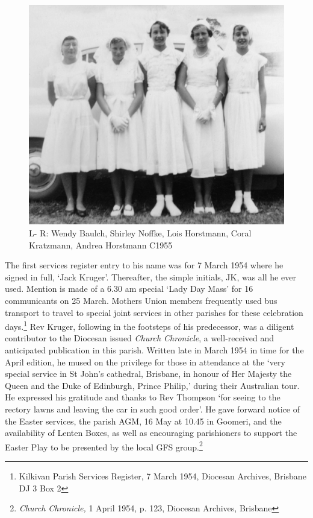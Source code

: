 \begin{figure}[!htb]
\begin{center}
\includegraphics[width=1.\textwidth,center]{../images/confirmation1955.jpg}
\caption{L- R: Wendy Baulch, Shirley Noffke, Lois Horstmann, Coral Kratzmann, Andrea Horstmann C1955}
\end{center}
\end{figure}




The first services register entry to his name was for 7 March 1954 where he signed in full, `Jack Kruger'. Thereafter, the simple initials, JK, was all he ever used. Mention is made of a 6.30 am special `Lady Day Mass' for 16 communicants on 25 March. Mothers Union members frequently used bus transport to travel to special joint services in other parishes for these celebration days.\footnote{Kilkivan Parish Services Register, 7 March 1954, Diocesan Archives, Brisbane DJ 3 Box 2} Rev Kruger, following in the footsteps of his predecessor, was a diligent contributor to the Diocesan issued \emph{Church Chronicle}, a well-received and anticipated publication in this parish. Written late in March 1954 in time for the April edition, he mused on the privilege for those in attendance at the `very special service in St John's cathedral, Brisbane, in honour of Her Majesty the Queen and the Duke of Edinburgh, Prince Philip,' during their Australian tour. He expressed his gratitude and thanks to Rev Thompson `for seeing to the rectory lawns and leaving the car in such good order'. He gave forward notice of the Easter services, the parish AGM, 16 May at 10.45 in Goomeri, and the availability of Lenten Boxes, as well as encouraging parishioners to support the Easter Play to be presented by the local GFS group.\footnote{\emph{Church Chronicle,} 1 April 1954, p. 123, Diocesan Archives, Brisbane}









